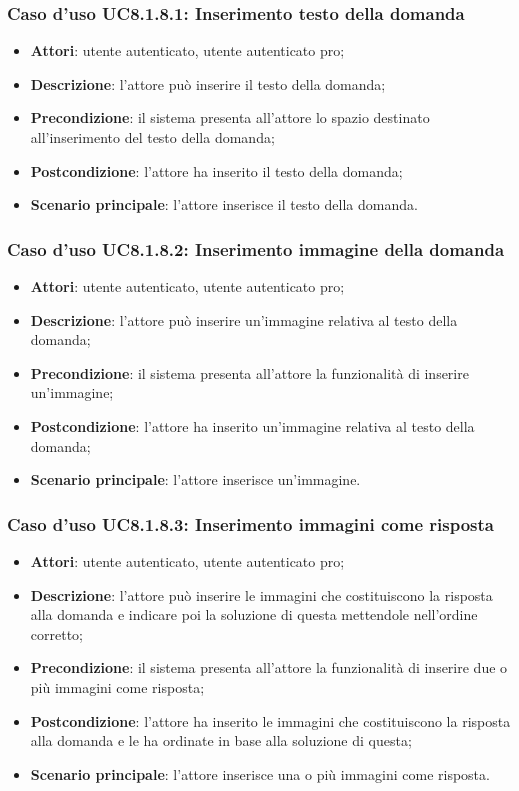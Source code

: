 \subsubsection{Caso d'uso UC8.1.8.1: Inserimento testo della domanda}
\begin{itemize}
	\item\textbf{Attori}: utente autenticato, utente autenticato pro;
	\item\textbf{Descrizione}: l'attore può inserire il testo della domanda;
	\item\textbf{Precondizione}: il sistema presenta all'attore lo spazio destinato all'inserimento del testo della domanda;
	\item \textbf{Postcondizione}: l'attore ha inserito il testo della domanda;
	\item\textbf{Scenario principale}: l'attore inserisce il testo della domanda. 
\end{itemize}

\subsubsection{Caso d'uso UC8.1.8.2: Inserimento immagine della domanda}
\begin{itemize}
	\item\textbf{Attori}: utente autenticato, utente autenticato pro;
	\item\textbf{Descrizione}: l'attore può inserire un'immagine relativa al testo della domanda;
	\item\textbf{Precondizione}: il sistema presenta all'attore la funzionalità di inserire un'immagine;
	\item \textbf{Postcondizione}: l'attore ha inserito un'immagine relativa al testo della domanda;
	\item\textbf{Scenario principale}: l'attore inserisce un'immagine.
\end{itemize}

\subsubsection{Caso d'uso UC8.1.8.3: Inserimento immagini come risposta}
\begin{itemize}
	\item\textbf{Attori}: utente autenticato, utente autenticato pro;
	\item\textbf{Descrizione}: l'attore può inserire le immagini che costituiscono la risposta alla domanda e indicare poi la soluzione di questa mettendole nell'ordine corretto;
	\item\textbf{Precondizione}: il sistema presenta all'attore la funzionalità di inserire due o più immagini come risposta; 
	\item \textbf{Postcondizione}: l'attore ha inserito le immagini che costituiscono la risposta alla domanda e le ha ordinate in base alla soluzione di questa;
	\item\textbf{Scenario principale}: l'attore inserisce una o più immagini come risposta.
\end{itemize}

